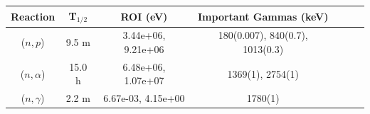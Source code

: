 \begin{figure}[!ht]
   \centering
   \quad
   \\ 
   \quad 
   \\ 

\end{figure}

\begin{table}[h]
\centering
\begin{tabular}{ |c|c|c|c|c|c|c| }
 \hline
 Reaction & T$_{1/2}$ & ROI (eV) & Important Gammas (keV) \\
 \hline 
 ($n,p$) &  9.5 m & 3.44e+06, 9.21e+06 & 180(0.007), 840(0.7), 1013(0.3) \\ 
\hline
 ($n,\alpha$) & 15.0 h & 6.48e+06, 1.07e+07 & 1369(1), 2754(1) \\ 
\hline
 ($n,\gamma$) &  2.2 m & 6.67e-03, 4.15e+00 & 1780(1) \\ 
\hline
\end{tabular}
\end{table}
